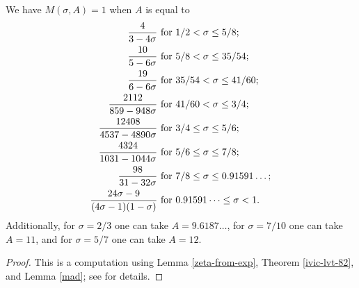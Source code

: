 \begin{lemma}\label{ivic-moment}\cite[Theorem 8.4]{ivic}  We have $M(\sigma,A) = 1$ when $A$ is equal to
\begin{align*}
    \frac{4}{3-4\sigma} & \hbox{ for } 1/2 < \sigma \leq 5/8; \\
    \frac{10}{5-6\sigma} & \hbox{ for } 5/8 < \sigma \leq 35/54; \\
    \frac{19}{6-6\sigma} & \hbox{ for } 35/54 < \sigma \leq 41/60; \\
    \frac{2112}{859-948\sigma} & \hbox{ for } 41/60 < \sigma \leq 3/4;\\
    \frac{12408}{4537-4890\sigma} & \hbox{ for } 3/4 \leq \sigma \leq 5/6; \\
    \frac{4324}{1031-1044\sigma} & \hbox{ for } 5/6 \leq \sigma \leq 7/8; \\
    \frac{98}{31-32\sigma} & \hbox{ for } 7/8 \leq \sigma \leq 0.91591\dots; \\
    \frac{24\sigma-9}{(4\sigma-1)(1-\sigma)} & \hbox{ for } 0.91591\dots \leq \sigma < 1.
\end{align*}
Additionally, for $\sigma=2/3$ one can take $A = 9.6187\dots$, for $\sigma = 7/10$ one can take $A=11$, and for $\sigma=5/7$ one can take $A=12$.
\end{lemma}

\begin{proof} This is a computation using Lemma \ref{zeta-from-exp}, Theorem \ref{ivic-lvt-82}, and Lemma \ref{mad}; see \cite{ivic} for details.
\end{proof}

